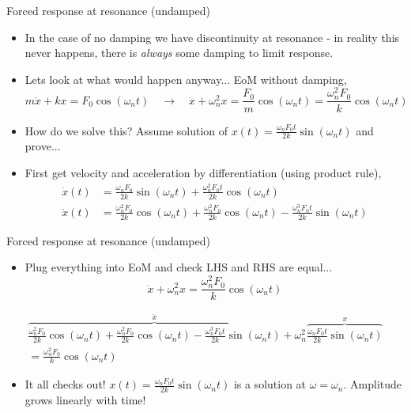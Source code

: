 \documentclass[11pt,aspectratio=169,handout]{beamer}
\begin{document}
\begin{frame}[c]{Forced response at resonance (undamped)}
	\begin{itemize}
		\item<1-> In the case of no damping we have discontinuity at resonance - in reality this never happens, there is \textit{always} some damping to limit response. 
		\item<2-> Lets look at what would happen anyway... EoM without damping,
		\begin{equation}
			m\ddot{x} +k x = F_0 \cos(\omega_n t)		\quad \rightarrow \quad  \ddot{x} +\omega_n^2 x = \frac{F_0}{m} \cos(\omega_n t)	= \frac{\omega_n^2 F_0}{k} \cos(\omega_n t)	
		\end{equation}
		\item<3-> How do we solve this? Assume solution of $x(t) =  \frac{\omega_n F_0 t}{2k} \sin(\omega_n t)$ and prove...
		\item<4-> First get velocity and acceleration by differentiation (using product rule),
		\begin{align}
			\dot{x}(t) &=  \frac{\omega_n F_0}{2k} \sin(\omega_n t) +  \frac{\omega_n^2 F_0 t}{2k} \cos(\omega_n t)\\
			\ddot{x}(t) & = \frac{\omega_n^2 F_0}{2k} \cos(\omega_n t) +  \frac{\omega_n^2 F_0}{2k} \cos(\omega_n t) -  \frac{\omega_n^3 F_0 t}{2k} \sin(\omega_n t)
		\end{align}
	\end{itemize}
\end{frame}

\begin{frame}[c]{Forced response at resonance (undamped)}
	\begin{itemize}
		\item<1-> Plug everything into EoM and check LHS and RHS are equal...
		\begin{equation}
			\ddot{x} +\omega_n^2 x =  \frac{\omega_n^2 F_0}{k} \cos(\omega_n t)	
		\end{equation}
	\end{itemize}
		\begin{align}\nonumber
		\overbrace{ \frac{\omega_n^2 F_0}{2k} \cos(\omega_n t) +  \frac{\omega_n^2 F_0}{2k} \cos(\omega_n t) -  \frac{\omega_n^3 F_0 t}{2k} \sin(\omega_n t)}^{	\ddot{x}} +\omega_n^2 \overbrace{ \frac{\omega_n F_0 t}{2k} \sin(\omega_n t)}^{x} \\=  \frac{\omega_n^2 F_0}{k} \cos(\omega_n t)	
		\end{align}
\begin{itemize}
		\item<2-> It all checks out! $x(t) =  \frac{\omega_n F_0 t}{2k} \sin(\omega_n t)$  is a solution at $\omega=\omega_n$. Amplitude grows linearly with time!
\end{itemize}
\end{frame}
\end{document}
